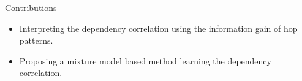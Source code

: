 \begin{block}{Contributions}


\begin{itemize}
\vspace{-0.5cm}
    \item Interpreting the dependency correlation using the information gain of hop patterns.
    \item Proposing a mixture model based method learning the dependency correlation.
\end{itemize}
\end{block}